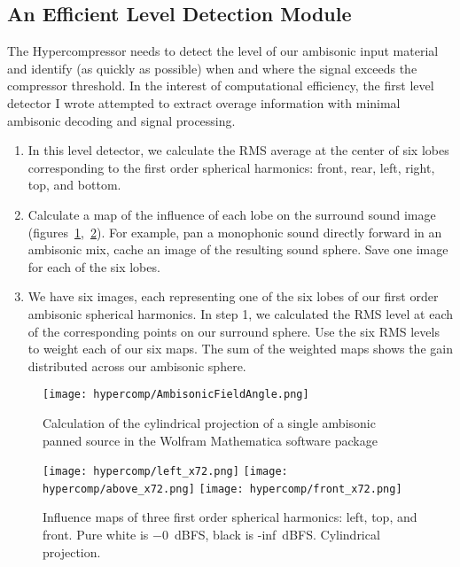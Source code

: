 \subsection{An Efficient Level Detection Module}
\label{sec:hyperc-level-detect}
The Hypercompressor needs to detect the level of our ambisonic input
material and identify (as quickly as possible) when and where the
signal exceeds the compressor threshold. In the interest of
computational efficiency, the first level detector I wrote attempted
to extract overage information with minimal ambisonic decoding and
signal processing.
\begin{enumerate}
\item In this level detector, we calculate the RMS average at the
  center of six lobes corresponding to the first order spherical
  harmonics: front, rear, left, right, top, and bottom.
\item Calculate a map of the influence of each lobe on the surround
  sound image
  (figures~\ref{fig:hypercomp-mathematica},~\ref{fig:hypercomp-inf-maps}). For
  example, pan a monophonic sound directly forward in an ambisonic
  mix, cache an image of the resulting sound sphere. Save one image
  for each of the six lobes.
\item We have six images, each representing one of the six lobes of our
  first order ambisonic spherical harmonics. In step 1, we calculated
  the RMS level at each of the corresponding points on our surround
  sphere. Use the six RMS levels to weight each of our six maps. The sum
  of the weighted maps shows the gain distributed across our ambisonic
  sphere.
\end{enumerate}

\begin{figure}[]
  \texttt{[image: hypercomp/AmbisonicFieldAngle.png]}
  \caption{Calculation of the cylindrical projection of a single ambisonic panned
    source in the Wolfram Mathematica software package}
  \label{fig:hypercomp-mathematica}
\end{figure}

\begin{figure}[]
 \texttt{[image: hypercomp/left\_x72.png]}
 \texttt{[image: hypercomp/above\_x72.png]}
 \texttt{[image: hypercomp/front\_x72.png]}
  \caption{Influence maps of three first order spherical harmonics: left, top, and
    front. Pure white is $-0$~dBFS, black is -inf~dBFS. Cylindrical projection.}
  \label{fig:hypercomp-inf-maps}
\end{figure}

